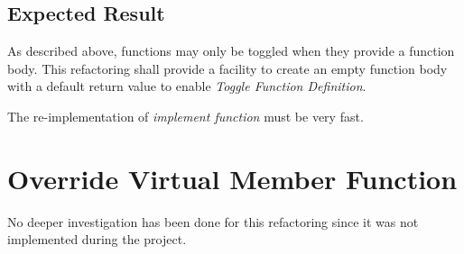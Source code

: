 
\subsection{Expected Result}
As described above, functions may only be toggled when they provide a function 
body. This refactoring shall provide a facility to create an empty function body 
with a default return value to enable \textit{Toggle Function Definition}.

The re-implementation of \textit{implement function} must be very fast. 

\section{Override Virtual Member Function}

No deeper investigation has been done for this refactoring since it was not 
implemented during the project.